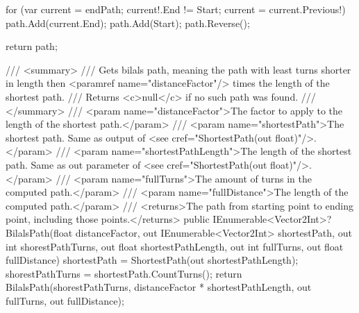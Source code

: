 \documentclass{article}
\theoremstyle{nonumberplain}
\begin{document}
\begin{lstcs}[]
{{        for (var current = endPath; current!.End != Start; current = current.Previous!) path.Add(current.End);
        path.Add(Start);
        path.Reverse();

        return path;
    }

    /// <summary>
    /// Gets bilals path, meaning the path with least turns shorter in length then <paramref name="distanceFactor"/> times the length of the shortest path.
    /// Returns <c>null</c> if no such path was found.
    /// </summary>
    /// <param name="distanceFactor">The factor to apply to the length of the shortest path.</param>
    /// <param name="shortestPath">The shortest path. Same as output of <see cref="ShortestPath(out float)"/>.</param>
    /// <param name="shortestPathLength">The length of the shortest path. Same as out parameter of <see cref="ShortestPath(out float)"/>.</param>
    /// <param name="fullTurns">The amount of turns in the computed path.</param>
    /// <param name="fullDistance">The length of the computed path.</param>
    /// <returns>The path from starting point to ending point, including those points.</returns>
    public IEnumerable<Vector2Int>? BilalsPath(float distanceFactor, out IEnumerable<Vector2Int> shortestPath, out int shorestPathTurns, out float shortestPathLength, out int fullTurns, out float fullDistance)
    {
        shortestPath = ShortestPath(out shortestPathLength);
        shorestPathTurns = shortestPath.CountTurns();
        return BilalsPath(shorestPathTurns, distanceFactor * shortestPathLength, out fullTurns, out fullDistance);
    }
}
\end{lstcs}
\end{document}
